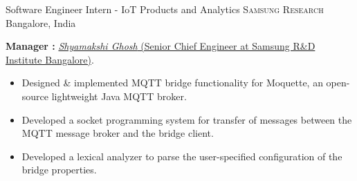 \documentclass[11pt,a4paper,sans]{moderncv} %
\begin{document}
{Software Engineer Intern - IoT Products and Analytics}
{\textsc{Samsung Research}}
{Bangalore, India}
{}
{
    \textbf{ Manager :} \href{https://www.linkedin.com/in/shyamakshi/}{\textit{Shyamakshi Ghosh} (Senior Chief Engineer at Samsung R\&D Institute Bangalore)}.
    \begin{itemize}
        \item{Designed \& implemented MQTT bridge functionality for Moquette, an open-source lightweight Java MQTT broker.}
        \item{Developed a socket programming system for transfer of messages between the MQTT message broker and the bridge client.}
        \item{Developed a lexical analyzer to parse the user-specified configuration of the bridge properties.}
    \end{itemize}
}

\end{document}
